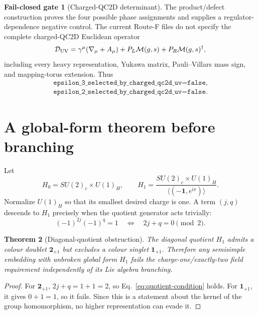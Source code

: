 \documentclass[11pt]{article}
\newtheorem{theorem}{Theorem}[section]
\theoremstyle{definition}
\newtheorem{gate}[theorem]{Fail-closed gate}
\theoremstyle{remark}
\newcommand{\ii}{\mathrm i}
\begin{document}
\begin{gate}[Charged-QC2D determinant]
The product/defect construction proves the four possible phase assignments
and supplies a regulator-dependence negative control.  The current Route-F
files do not specify the complete charged-QC2D Euclidean operator
\begin{equation}
 \mathcal D_{\rm UV}
 =\gamma^\mu(\nabla_\mu+A_\mu)
 +P_L\mathcal M(g,s)+P_R\mathcal M(g,s)^\dagger,
 \label{eq:actual-uv-operator}
\end{equation}
including every heavy representation, Yukawa matrix, Pauli--Villars mass
sign, and mapping-torus extension.  Thus
\begin{equation}
 \begin{gathered}
 \texttt{epsilon\_3\_selected\_by\_charged\_qc2d\_uv=false},\\
 \texttt{epsilon\_2\_selected\_by\_charged\_qc2d\_uv=false}.
 \end{gathered}
 \label{eq:eta-fail-closed}
\end{equation}
\end{gate}

\section{A global-form theorem before branching}

Let
\begin{equation}
 H_0=SU(2)_c\times U(1)_H,
 \qquad
 H_1=\frac{SU(2)_c\times U(1)_H}
 {\langle(-\bm1,e^{\ii\pi})\rangle}.
 \label{eq:H-forms}
\end{equation}
Normalize \(U(1)_H\) so that its smallest desired charge is one.  A term
\((j,q)\) descends to \(H_1\) precisely when the quotient generator acts
trivially:
\begin{equation}
 (-1)^{2j}(-1)^q=1
 \quad\Longleftrightarrow\quad
 2j+q=0\pmod2.
 \label{eq:quotient-condition}
\end{equation}

\begin{theorem}[Diagonal-quotient obstruction]
The diagonal quotient \(H_1\) admits a colour doublet \(\bm2_{+1}\) but
excludes a colour singlet \(\bm1_{+1}\).  Therefore any semisimple embedding
with unbroken global form \(H_1\) fails the charge-one/exactly-two field
requirement independently of its Lie algebra branching.
\end{theorem}
\begin{proof}
For \(\bm2_{+1}\), \(2j+q=1+1=2\), so Eq.~\eqref{eq:quotient-condition}
holds.  For \(\bm1_{+1}\), it gives \(0+1=1\), so it fails.  Since this is a
statement about the kernel of the group homomorphism, no higher
representation can evade it.
\end{proof}
\end{document}
